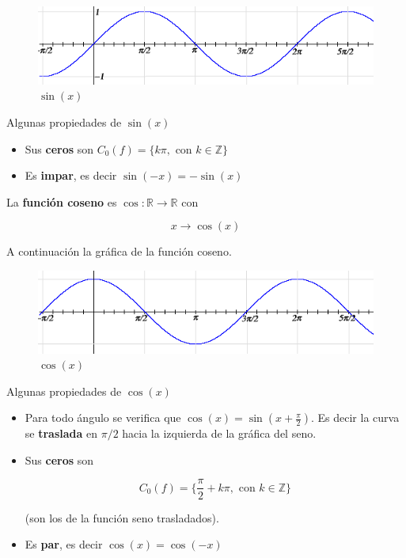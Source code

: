 \begin{figure}[h]
\centering\includegraphics[scale=0.5]{images/01_precalculo/sin.png}
\caption{$\sin(x)$}
\end{figure}

\begin{property}
Algunas propiedades de $\sin(x)$

\begin{itemize}
	
\item Sus \textbf{ceros} son $C_0(f) = \{ k\pi, \textrm{ con } k \in \mathbb{Z} \}$
	
\item Es \textbf{impar}, es decir $\sin(-x) = -\sin(x)$
	
\end{itemize}
\end{property}

\begin{definition}[Coseno] 
La \textbf{función coseno} es $\cos : \mathbb{R} \to \mathbb{R}$ con 

$$ x \to \cos(x)$$

A continuación la gráfica de la función coseno.
\end{definition}

\begin{figure}[h]
\centering\includegraphics[scale=0.5]{images/01_precalculo/cos.png}
\caption{$\cos(x)$}
\end{figure}

\begin{property}
Algunas propiedades de $\cos(x)$

\begin{itemize}

\item Para todo ángulo se verifica que $\cos(x) = \sin(x + \frac{\pi}{2})$.  Es decir la curva se \textbf{traslada} en $\pi/2$ hacia la izquierda de la gráfica del seno.

\item Sus \textbf{ceros} son 

$$C_0(f) = \{ \frac{\pi}{2} + k\pi, \textrm{ con } k \in \mathbb{Z} \}$$

(son los de la función seno trasladados).

\item Es \textbf{par}, es decir $\cos(x) = \cos(-x)$

\end{itemize}
\end{property}

